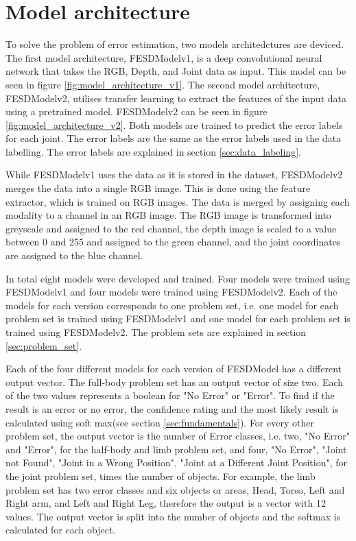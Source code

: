 \section{Model architecture}
\label{sec:model_architecture}

To solve the problem of error estimation, two models architedctures are deviced. The first model architecture, FESDModelv1, is a deep convolutional neural network that takes the RGB, Depth, and Joint data as input. This model can be seen in figure \ref{fig:model_architecture_v1}. The second model architecture, FESDModelv2, utilises transfer learning to extract the features of the input data using a pretrained model. FESDModelv2 can be seen in figure \ref{fig:model_architecture_v2}. Both models are trained to predict the error labels for each joint. The error labels are the same as the error labels used in the data labelling. The error labels are explained in section \ref{sec:data_labeling}.

While FESDModelv1 uses the data as it is stored in the dataset, FESDModelv2 merges the data into a single RGB image. This is done using the feature extractor, which is trained on RGB images. The data is merged by assigning each modality to a channel in an RGB image. The RGB image is transformed into greyscale and assigned to the red channel, the depth image is scaled to a value between 0 and 255 and assigned to the green channel, and the joint coordinates are assigned to the blue channel.

In total eight models were developed and trained. Four models were trained using FESDModelv1 and four models were trained using FESDModelv2. Each of the models for each version corresponds to one problem set, i.e. one model for each problem set is trained using FESDModelv1 and one model for each problem set is trained using FESDModelv2. The problem sets are explained in section \ref{sec:problem_set}.

Each of the four different models for each version of FESDModel has a different output vector. The full-body problem set has an output vector of size two. Each of the two values represents a boolean for "No Error" or "Error". To find if the result is an error or no error, the confidence rating and the most likely result is calculated using soft max(see section \ref{sec:fundamentals}). For every other problem set, the output vector is the number of Error classes, i.e. two, "No Error" and "Error", for the half-body and limb problem set, and four, "No Error", "Joint not Found", "Joint in a Wrong Position", "Joint at a Different Joint Position", for the joint problem set, times the number of objects. For example, the limb problem set has two error classes and six objects or areas, Head, Torso, Left and Right arm, and Left and Right Leg, therefore the output is a vector with 12 values. The output vector is split into the number of objects and the softmax is calculated for each object. 

